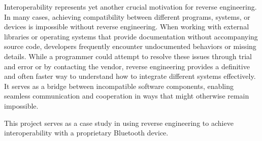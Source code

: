 Interoperability represents yet another crucial motivation for reverse engineering. In many cases, achieving compatibility between different programs, systems, or devices is impossible without reverse engineering. When working with external libraries or operating systems that provide documentation without accompanying source code, developers frequently encounter undocumented behaviors or missing details. While a programmer could attempt to resolve these issues through trial and error or by contacting the vendor, reverse engineering provides a definitive and often faster way to understand how to integrate different systems effectively. It serves as a bridge between incompatible software components, enabling seamless communication and cooperation in ways that might otherwise remain impossible.

This project serves as a case study in using reverse engineering to achieve interoperability with a proprietary Bluetooth device.
